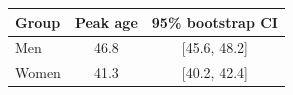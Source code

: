\begin{tabular}{lcc}
\toprule
Group & Peak age & 95\% bootstrap CI \\
\midrule
Men & 46.8 & [45.6, 48.2] \\
Women & 41.3 & [40.2, 42.4] \\
\bottomrule
\end{tabular}
